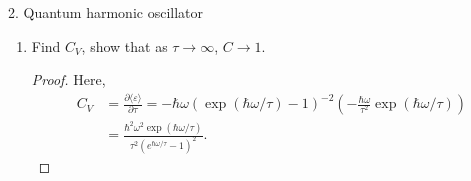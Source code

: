 \documentclass[11pt]{article}
\begin{document}
\begin{problem}{2. Quantum harmonic oscillator}
\begin{enumerate}[label=(\alph*)]
\begin{proof}
        \end{proof}
  \item Find \( C_V \), show that as \(\tau \rightarrow \infty\), \( C \rightarrow 1 \).
        \begin{proof}
          Here,
          \begin{equation}
          \label{eq:12}
          \begin{aligned}
            C_V &= \frac{\partial \langle\varepsilon\rangle}{\partial \tau} = -\hbar\omega(\exp(\hbar\omega/\tau)-1)^{-2}(- \frac{\hbar\omega}{\tau^2} \exp(\hbar\omega/\tau)) \\
            &= \frac{\hbar^2\omega^2 \exp(\hbar\omega/\tau)}{\tau^2(e^{\hbar\omega/\tau} - 1)^2}.
          \end{aligned}
          \end{equation}
        \end{proof}
\end{enumerate}
\end{problem}
\end{document}

